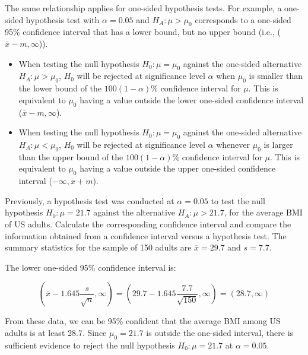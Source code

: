 \begin{spacing}{1.5}
\begin{example}
\end{example}
	
The same relationship applies for one-sided hypothesis tests. For example, a one-sided hypothesis test with $\alpha = 0.05$ and $H_A: \mu > \mu_0$ corresponds to a one-sided 95\% confidence interval that has a lower bound, but no upper bound (i.e., ($\overline{x} - m, \infty$)).
	
\begin{termBox}{
  {
  	\begin{itemize}
	\item When testing the null hypothesis $H_0:\mu = \mu_0$ against the one-sided alternative $H_A: \mu > \mu_0$, $H_0$ will be rejected at significance level $\alpha$ when $\mu_0$ is smaller than the lower bound of the $100(1-\alpha)\%$ confidence interval for $\mu$. This is equivalent to $\mu_0$ having a value outside the lower one-sided confidence interval ($\overline{x} - m, \infty$).

	\item When testing the null hypothesis $H_0:\mu = \mu_0$ against the one-sided alternative $H_A: \mu < \mu_0$, $H_0$ will be rejected at significance level $\alpha$ whenever $\mu_0$ is larger than the upper bound of the $100(1-\alpha)\%$ confidence interval for $\mu$. This is equivalent to $\mu_0$ having a value outside the upper one-sided confidence interval ($-\infty, \overline{x} + m$).
	\end{itemize}
  }}
\end{termBox}
		
\begin{example}
{Previously, a hypothesis test was conducted at $\alpha = 0.05$ to test the null hypothesis $H_0: \mu = 21.7$ against the alternative $H_A: \mu > 21.7$, for the average BMI of US adults. Calculate the corresponding confidence interval and compare the information obtained from a confidence interval versus a hypothesis test. The summary statistics for the sample of 150 adults are $\overline{x} = 29.7$ and $s = 7.7$.}	

The lower one-sided 95\% confidence interval is:

\[(\overline{x} - 1.645 \dfrac{s}{\sqrt{n}}, \infty) = (29.7 - 1.645\dfrac{7.7}{\sqrt{150}}, \infty) = (28.7, \infty) \]

From these data, we can be 95\% confident that the average BMI among US adults is at least 28.7. Since $\mu_0 = 21.7$ is outside the one-sided interval, there is sufficient evidence to reject the null hypothesis $H_0: \mu = 21.7$ at $\alpha = 0.05$. 


\end{example}
\end{spacing}
